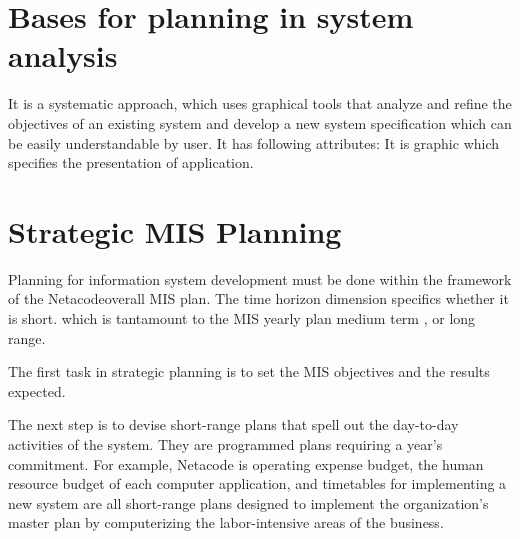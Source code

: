 \documentclass[a4paper,12pt]{report}
\begin{document}
\section{Bases for planning in system analysis}
It is a systematic approach, which uses graphical tools that analyze and refine the objectives of an existing system and develop a new system specification which can be easily understandable by user. It has following attributes: It is graphic which specifies the presentation of application.
\section{Strategic MIS Planning}
Planning for information system development must be done within the framework of the Netacodeoverall MIS plan. The time horizon dimension specifics whether it is short. which is tantamount to the MIS yearly plan medium term , or long range. 

 The first task in strategic planning is to set the MIS objectives and the results expected. 
 
 The next step is to devise short-range plans that spell out the day-to-day activities of the system. They are programmed plans requiring a year's commitment. For example, Netacode is operating expense budget, the human resource budget of each computer application, and timetables for implementing a new system are all short-range plans designed to implement the organization's master plan by computerizing the labor-intensive areas of the business.
\end{document}
